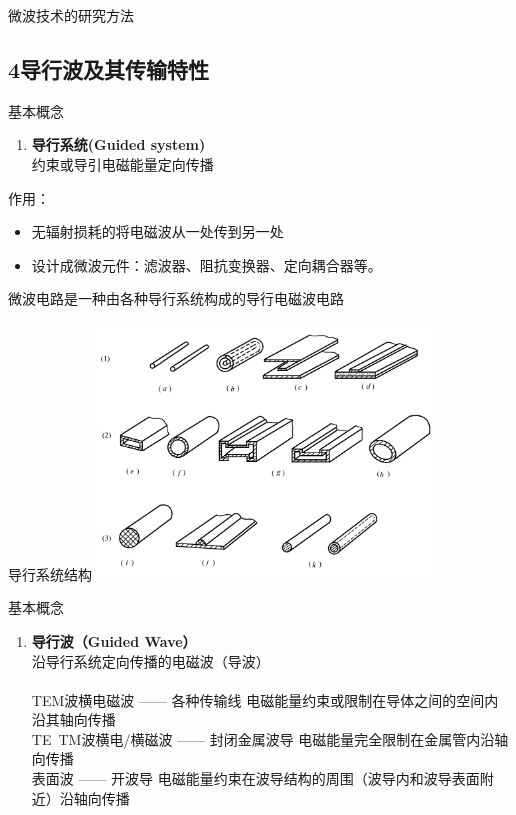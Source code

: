 \documentclass{beamer}
\newcounter{savedenum}
\newcommand*{\saveenum}{\setcounter{savedenum}{\theenumi}}
\newcommand*{\resume}{\setcounter{enumi}{\thesavedenum}}
\begin{document}
\begin{frame}{微波技术的研究方法}

\end{frame}

\subsection{4\quad 导行波及其传输特性}
\begin{frame}{基本概念}
  \begin{enumerate}
    \item \textbf{导行系统(Guided system)}
    \saveenum
    \\约束或导引电磁能量定向传播
  \end{enumerate}
  作用：\\
  \begin{itemize}
    \item 无辐射损耗的将电磁波从一处传到另一处
    \item 设计成微波元件：滤波器、阻抗变换器、定向耦合器等。
  \end{itemize}
  微波电路是一种由各种导行系统构成的导行电磁波电路
\end{frame}

\begin{frame}{导行系统结构}
    \centering
    \includegraphics[width=9cm]{guidesystem.png}
\end{frame}

\begin{frame}{基本概念}
  \begin{enumerate}
    \resume
    \item \textbf{导行波（Guided Wave）}
    \\沿导行系统定向传播的电磁波（导波）
    \\
    \\TEM波\quad 横电磁波 —— 各种传输线 电磁能量约束或限制在导体之间的空间内沿其轴向传播
    \\TE\ TM波\quad 横电/横磁波 —— 封闭金属波导 电磁能量完全限制在金属管内沿轴向传播
    \\表面波 —— 开波导 电磁能量约束在波导结构的周围（波导内和波导表面附近）沿轴向传播
    \saveenum
  \end{enumerate}
\end{frame}
\end{document}
